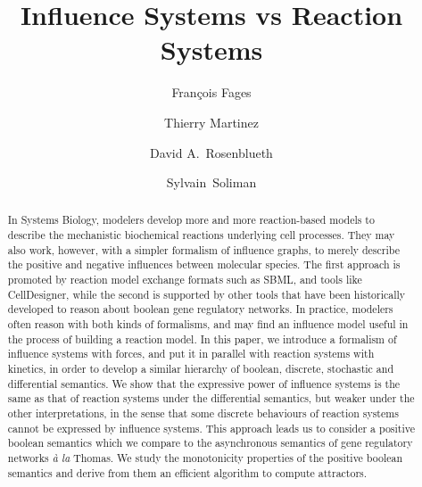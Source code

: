 \documentclass{llncs}
\begin{document}



\title{Influence Systems vs Reaction Systems}

\author{Fran\c{c}ois Fages \and Thierry Martinez \and
   David A.\ Rosenblueth \and \mbox{Sylvain Soliman}}

\institute{Inria Saclay-\^Ile-de-France, Team Lifeware, France\\
   \email{Francois.Fages@inria.fr} \email{Sylvain.Soliman@inria.fr}
   \and
   Inria Paris, SED, France \email{Thierry.Martinez@inria.fr}
   \and Instituto de Investigaciones en Matem\'aticas Aplicadas y en Sistemas (IIMAS), Universidad Nacional Aut\'onoma de M\'exico (UNAM) \email{drosenbl@unam.mx}}

\maketitle



\begin{abstract}

   In Systems Biology, modelers develop more and more re\-action-based models to
   describe the mechanistic biochemical reactions underlying cell processes.
   They may also work, however, with a simpler formalism of influence graphs,
   to merely describe the positive and negative influences between molecular species.
   The first approach is promoted by reaction model exchange formats such as
   SBML, and tools like CellDesigner,
   while the second is supported by other tools that have been historically
   developed to reason about boolean gene regulatory networks.
   In practice, modelers often reason with both kinds of formalisms,
   and may find an influence model useful
   in the process of building a reaction model.
   In this paper, we introduce a formalism of influence systems with forces,
   and put it in parallel with reaction systems with kinetics,
   in order to develop a similar hierarchy of boolean, discrete, stochastic and differential semantics.
   We show that the expressive power of influence systems is the same as
   that of reaction systems under the differential semantics,
   but weaker under the other interpretations, in the sense that some discrete
   behaviours of reaction systems cannot be expressed by influence systems.
   This approach leads us to consider a positive boolean semantics which we compare
   to the asynchronous semantics of gene regulatory networks \emph{\`a la} Thomas.
   We study the monotonicity properties of the positive boolean semantics
   and derive from them an efficient algorithm to compute attractors.
\end{abstract}
\end{document}

